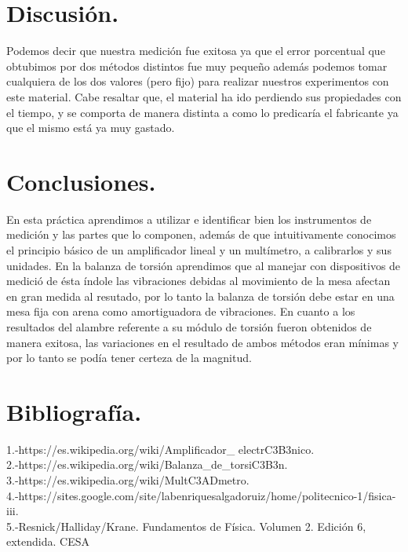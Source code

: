 \documentclass[11pt,a4paper]{article}
\begin{document}
\section{Discusi\'{o}n.}
Podemos decir que nuestra medici\'{o}n fue exitosa ya que el error porcentual que obtubimos por dos m\'{e}todos distintos fue muy peque\~{n}o adem\'{a}s podemos tomar cualquiera de los dos valores (pero fijo) para realizar nuestros experimentos con este material. Cabe resaltar que, el material ha ido perdiendo sus propiedades con el tiempo, y se comporta de manera distinta a como lo predicar\'{i}a el fabricante ya que el mismo est\'{a} ya muy gastado.    


\section{Conclusiones.}
En esta pr\'{a}ctica aprendimos a utilizar e identificar bien los instrumentos de medici\'{o}n y las partes que lo componen, adem\'{a}s de que intuitivamente conocimos el principio b\'{a}sico de un amplificador lineal y un mult\'{i}metro, a calibrarlos y sus unidades. En la balanza de torsi\'{o}n aprendimos que al manejar con dispositivos de medici\'{o} de \'{e}sta \'{i}ndole las vibraciones debidas al movimiento de la mesa afectan en gran medida al resutado, por lo tanto la balanza de torsi\'{o}n debe estar en una mesa fija con arena como amortiguadora de vibraciones. En cuanto a los resultados del alambre referente a su m\'{o}dulo de torsi\'{o}n fueron obtenidos de manera exitosa, las variaciones en el resultado de ambos m\'{e}todos eran m\'{i}nimas y por lo tanto se pod\'{i}a tener certeza de la magnitud.

 \section{Bibliograf\'{i}a.}
1.-https://es.wikipedia.org/wiki/Amplificador_ electrC3B3nico.\\
2.-https://es.wikipedia.org/wiki/Balanza_de_torsiC3B3n.\\
3.-https://es.wikipedia.org/wiki/MultC3ADmetro.\\
4.-https://sites.google.com/site/labenriquesalgadoruiz/home/politecnico-1/fisica-iii.\\
5.-Resnick/Halliday/Krane. Fundamentos de F\'{i}sica. Volumen 2. Edici\'{o}n 6, extendida. CESA\\

\end{document}
